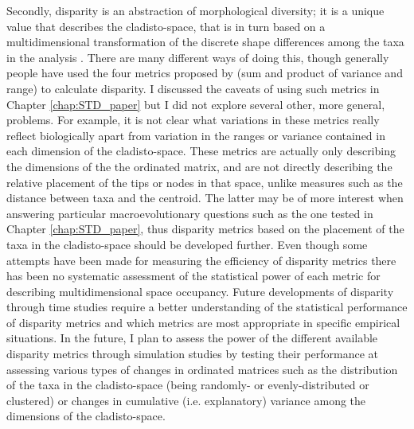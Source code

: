 Secondly, disparity is an abstraction of morphological diversity; it is a unique value that describes the cladisto-space, that is in turn based on a multidimensional transformation of the discrete shape differences among the taxa in the analysis \citep{Wills1994,foote1997evolution}.
There are many different ways of doing this, though generally people have used the four metrics proposed by \cite{Wills1994} (sum and product of variance and range) to calculate disparity.
I discussed the caveats of using such metrics in Chapter \ref{chap:STD_paper} but I did not explore several other, more general, problems.
For example, it is not clear what variations in these metrics really reflect biologically apart from variation in the ranges or variance contained in each dimension of the cladisto-space.
These metrics are actually only describing the dimensions of the the ordinated matrix, and are not directly describing the relative placement of the tips or nodes in that space, unlike measures such as the distance between taxa and the centroid. 
The latter may be of more interest when answering particular macroevolutionary questions such as the one tested in Chapter \ref{chap:STD_paper}, thus disparity metrics based on the placement of the taxa in the cladisto-space should be developed further.
Even though some attempts have been made for measuring the efficiency %
 of disparity metrics \citep{Ciampaglio2001} there has been no systematic assessment of the statistical power of each metric for describing multidimensional space occupancy.
Future developments of disparity through time studies require a better understanding of the statistical performance of disparity metrics and which metrics are most appropriate in specific empirical situations.
In the future, I plan to assess the power of the different available disparity metrics \citep[e.g.][]{Wills1994,Ciampaglio2004,Hughes20082013,huang2015origins} through simulation studies by testing their performance at assessing various types of changes in ordinated matrices such as the distribution of the taxa in the cladisto-space (being randomly- or evenly-distributed or clustered) or changes in cumulative (i.e. explanatory) variance among the dimensions of the cladisto-space.


